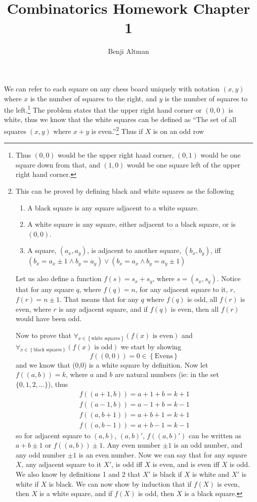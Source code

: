 \documentclass{article}
\title{Combinatorics Homework Chapter 1}
\author{Benji Altman}
\begin{document}
\maketitle

We can refer to each square on any chess board uniquely with notation $(x,y)$ where $x$ is the number of squares to the right, and $y$ is the number of squares to the left.\footnote{Thus $(0,0)$ would be the upper right hand corner, $(0,1)$ would be one square down from that, and $(1,0)$ would be one square left of the upper right hand corner.} The problem states that the upper right hand corner or $(0,0)$ is white, thus we know that the white squares can be defined as ``The set of all squares $(x,y)$ where $x+y$ is even.''\footnote{This can be proved by defining black and white squares as the following
\begin{enumerate}
\item A black square is any square adjacent to a white square.
\item A white square is any square, either adjacent to a black square, or is $(0,0)$.
\item A square, $(a_x,a_y)$, is adjacent to another square, $(b_x,b_y)$, iff $(b_x = a_x \pm 1 \land b_y = a_y) \lor (b_x = a_x \land b_y = a_y \pm 1)$
\end{enumerate}

Let us also define a function $f(s)=s_x+s_y$, where $s=(s_x,s_y)$. Notice that for any square $q$, where $f(q) = n$, for any adjacent square to it, $r$, $f(r) = n \pm 1$. That means that for any $q$ where $f(q)$ is odd, all $f(r)$ is even, where $r$ is any adjacent square, and if $f(q)$ is even, then all $f(r)$ would have been odd.

Now to prove that $\forall_{x \in \left\{\text{white squares}\right\}}\left(f(x) \text{ is even}\right)$ and $\forall_{x \in \left\{\text{black squares}\right\}}\left(f(x) \text{ is odd}\right)$ we start by showing
\begin{equation}
f((0,0)) = 0 \in \left\{\text{Evens}\right\}
\end{equation}
and we know that (0,0) is a white square by definition. Now let $f((a,b))=k$, where $a$ and $b$ are natural numbers (ie: in the set $\{0,1,2,\ldots \}$), thus
\begin{equation}
\begin{aligned}
f((a+1,b))=a+1+b=k+1 \\
f((a-1,b))=a-1+b=k-1 \\
f((a,b+1))=a+b+1=k+1 \\
f((a,b-1))=a+b-1=k-1
\end{aligned}
\end{equation}
so for adjacent square to $(a,b)$, $(a,b)'$, $f\left((a,b)'\right)$ can be written as $a+b\pm1$ or $f((a,b))\pm1$. Any even number $\pm 1$ is an odd number, and any odd number $\pm 1$ is an even number. Now we can say that for any square $X$, any adjacent square to it $X'$, is odd iff $X$ is even, and is even iff $X$ is odd. We also know by definitions 1 and 2 that $X'$ is black if $X$ is white and $X'$ is white if $X$ is black. We can now show by induction that if $f(X)$ is even, then $X$ is a white square, and if $f(X)$ is odd, then $X$ is a black square.} Thus if $X$ is on an odd row
\end{document}
